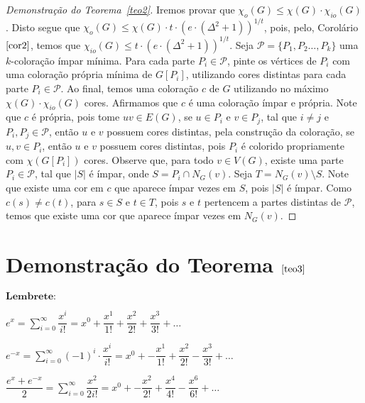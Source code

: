 \documentclass[12pt]{article}
\begin{document}
{ \begin{proof}[Demonstração do Teorema~\ref{teo2}]
 	Iremos provar que $\chi_{o}(G) \leq \chi(G) {\cdot} \chi_{io}(G)$. Disto segue que $\chi_{o}(G) \leq \chi(G) {\cdot} t {\cdot} (e {\cdot} (\Delta^2 + 1))^{1/t}$, pois, pelo, Corolário $\ref{cor2}$, temos que $ \chi_{io}(G) \leq t {\cdot} (e {\cdot} (\Delta^2 + 1))^{1/t}$. Seja $\mathcal{P} = \{P_1, P_2 \ldots, P_k\}$ uma $k$-coloração ímpar mínima. Para cada parte $P_i \in \mathcal{P}$, pinte os vértices de $P_i$ com uma coloração própria mínima de $G[P_i]$, utilizando cores distintas para cada parte $P_i \in \mathcal{P}$. Ao final, temos uma coloração $c$ de $G$ utilizando no máximo $\chi(G) {\cdot} \chi_{io}(G)$ cores. Afirmamos que $c$ é uma coloração ímpar e própria. Note que $c$ é própria, pois tome $uv \in E(G)$, se $u \in P_i$ e $v \in P_j$, tal que $i \neq j$ e $P_i, P_j \in \mathcal{P}$, então $u$ e $v$ possuem cores distintas, pela construção da coloração, se $u, v \in P_i$, então $u$ e $v$ possuem cores distintas, pois $P_i$ é colorido propriamente com $\chi(G[P_i])$ cores. Observe que, para todo $v \in V(G)$, existe uma parte $P_i \in \mathcal{P}$, tal que $|S|$ é ímpar, onde $S = P_i \cap N_G(v)$. Seja $T = N_G(v) \setminus S$. Note que existe uma cor em $c$ que aparece ímpar vezes em $S$, pois $|S|$ é ímpar. Como $c(s) \neq c(t)$, para $s \in S$ e $t \in T$, pois $s$ e $t$ pertencem a partes distintas de $\mathcal{P}$, temos que existe uma cor que aparece ímpar vezes em $N_G(v)$. 
 	
 \end{proof}
 
  \section{Demonstração do Teorema $\ref{teo3}$} \newl
 
 $\textbf{Lembrete:}$ \newl
 
 $e^x = \sum\limits_{i = 0}^{\infty}\dfrac{x^i}{i!} = x^0 + \dfrac{x^1}{1!} + \dfrac{x^2}{2!} + \dfrac{x^3}{3!} + \ldots$ \newl
 
  $e^{-x} = \sum\limits_{i = 0}^{\infty}(-1)^i {\cdot } \dfrac{ x^i}{i!} = x^0 +-\dfrac{x^1}{1!} + \dfrac{x^2}{2!} - \dfrac{x^3}{3!} + \ldots$ \newl
 
   $\dfrac{e^x + e^{-x}}{2} = \sum\limits_{i = 0}^{\infty}  \dfrac{ x^{2}}{2i!} = x^0 +-\dfrac{x^2}{2!} + \dfrac{x^4}{4!} - \dfrac{x^6}{6!} + \ldots$ \newl
   
  \vspace{5mm}
  
}
\end{document}
